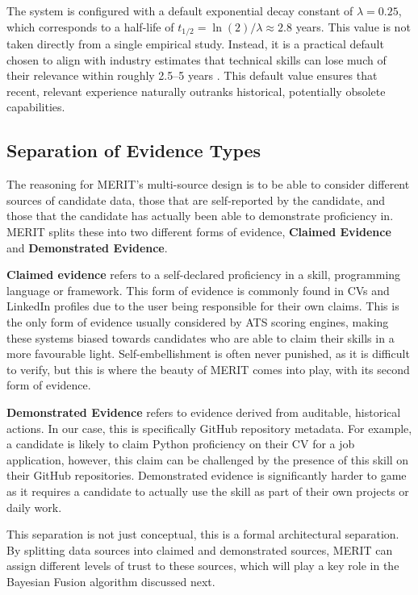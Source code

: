 The system is configured with a default exponential decay constant of $\lambda = 0.25$,
which corresponds to a half-life of $t_{1/2} = \ln(2)/\lambda \approx 2.8$ years.
This value is not taken directly from a single empirical study. Instead, it is a practical default chosen to align with
industry estimates that technical skills can lose much of their relevance within roughly 2.5--5 years \cite{ibm2019skillsgap}.
This default value ensures that recent, relevant experience naturally outranks historical,
potentially obsolete capabilities.




\subsection{Separation of Evidence Types}
The reasoning for MERIT's multi-source design is to be able to consider different sources of candidate data,
those that are self-reported by the candidate, and those that the candidate has actually been able to demonstrate
proficiency in. MERIT splits these into two different forms of evidence, \textbf{Claimed Evidence} and 
\textbf{Demonstrated Evidence}.

\textbf{Claimed evidence} refers to a self-declared proficiency in a skill, programming language or framework.
This form of evidence is commonly found in CVs and LinkedIn profiles due to the user being responsible
for their own claims. This is the only form of evidence usually considered by ATS scoring engines, making
these systems biased towards candidates who are able to claim their skills in a more favourable light. Self-embellishment
is often never punished, as it is difficult to verify, but this is where the beauty of MERIT comes into play,
with its second form of evidence.

\textbf{Demonstrated Evidence} refers to evidence derived from auditable, historical actions. In our case, this is 
specifically GitHub repository metadata. For example, a candidate is likely to claim Python proficiency on their CV for 
a job application, however, this claim can be challenged by the presence of this skill on their GitHub repositories.
Demonstrated evidence is significantly harder to game as it requires a candidate to actually use the skill as part of 
their own projects or daily work.

This separation is not just conceptual, this is a formal architectural separation. By splitting data sources into claimed
and demonstrated sources, MERIT can assign different levels of trust to these sources, which will play a key role in the 
Bayesian Fusion algorithm discussed next.

